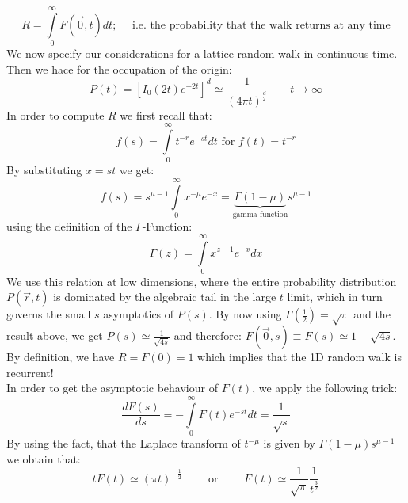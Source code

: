 \begin{equation*}
	R=\int\limits_0^\infty F(\vec{0},t)dt; \quad \text{ i.e. the probability that the walk returns at any time}
\end{equation*}
We now specify our considerations for a lattice random walk in continuous time. Then we hace for the occupation of the origin:
\begin{equation*}
	P(t)=\left[I_0(2t)e^{-2t}\right]^d\simeq \frac{1}{(4\pi t)^\frac{d}{2}} \qquad t\to\infty
\end{equation*}
In order to compute $R$ we first recall that:
\begin{equation*}
	f(s)=\int\limits_0^\infty t^{-r}e^{-st}dt \text{ for $f(t)=t^{-r}$}
\end{equation*}
By substituting $x=st$ we get:
\begin{equation*}
	f(s)=s^{\mu-1}\int\limits_0^\infty x^{-\mu}e^{-x}=\underset{\text{gamma-function}}{\underbrace{\Gamma(1-\mu)}}s^{\mu-1}
\end{equation*}
using the definition of the $\Gamma$-Function:
\begin{equation*}
	\Gamma(z)=\int\limits_0^\infty x^{z-1}e^{-x}dx
\end{equation*}
We use this relation at low dimensions, where the entire probability distribution $P(\vec{r},t)$ is dominated by the algebraic tail in the large $t$ limit, which in turn governs the small $s$ asymptotics of $P(s)$.
By now using $\Gamma\left(\frac{1}{2}\right)=\sqrt{\pi}$ and the result above, we get $P(s)\simeq\frac{1}{\sqrt{4s}}$ and therefore: $F(\vec{0},s)\equiv F(s)\simeq 1-\sqrt{4s}$.\\
By definition, we have $R=F(0)=1$ which implies that the 1D random walk is recurrent!\\
In order to get the asymptotic behaviour of $F(t)$, we apply the following trick:
\begin{equation*}
	\frac{dF(s)}{ds}=-\int\limits_0^\infty F(t)e^{-st}dt=\frac{1}{\sqrt{s}}
\end{equation*}
By using the fact, that the Laplace transform of $t^{-\mu}$ is given by $\Gamma(1-\mu)s^{\mu-1}$ we obtain that:
\begin{equation*}
	tF(t)\simeq (\pi t)^{-\frac{1}{2}} \qquad\text{ or }\qquad F(t)\simeq\frac{1}{\sqrt{\pi}}\frac{1}{t^\frac{3}{2}}
\end{equation*}
